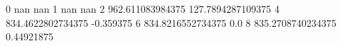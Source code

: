 0 nan nan
1 nan nan
2 962.611083984375 127.7894287109375
4 834.4622802734375 -0.359375
6 834.8216552734375 0.0
8 835.2708740234375 0.44921875
